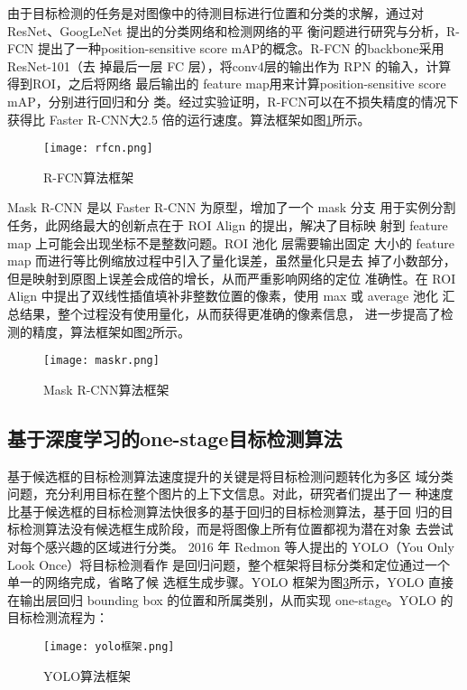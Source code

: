 由于目标检测的任务是对图像中的待测目标进行位置和分类的求解，通过对ResNet、GoogLeNet
提出的分类网络和检测网络的平
衡问题进行研究与分析，R-FCN 提出了一种position-sensitive score mAP的概念。R-FCN 的backbone采用ResNet-101（去
掉最后一层 FC 层），将conv4层的输出作为 RPN 的输入，计算得到ROI，之后将网络
最后输出的 feature map用来计算position-sensitive score mAP，分别进行回归和分
类。经过实验证明，R-FCN可以在不损失精度的情况下获得比 Faster R-CNN大2.5 倍的运行速度。算法框架如图\ref{rfcn}所示。

\begin{figure}[htbp]
    \centering
    \texttt{[image: rfcn.png]}
    \caption{R-FCN算法框架}
    \label{rfcn}
\end{figure}

Mask R-CNN 是以 Faster R-CNN 为原型，增加了一个 mask 分支
用于实例分割任务，此网络最大的创新点在于 ROI Align 的提出，解决了目标映
射到 feature map 上可能会出现坐标不是整数问题。ROI 池化 层需要输出固定
大小的 feature map 而进行等比例缩放过程中引入了量化误差，虽然量化只是去
掉了小数部分，但是映射到原图上误差会成倍的增长，从而严重影响网络的定位
准确性。在 ROI Align 中提出了双线性插值填补非整数位置的像素，使用 max 或
average 池化 汇总结果，整个过程没有使用量化，从而获得更准确的像素信息，
进一步提高了检测的精度，算法框架如图\ref{maskr}所示。

\begin{figure}[htbp]
    \centering
    \texttt{[image: maskr.png]}
    \caption{Mask R-CNN算法框架}
    \label{maskr}
\end{figure}

\subsection{基于深度学习的one-stage目标检测算法}
基于候选框的目标检测算法速度提升的关键是将目标检测问题转化为多区
域分类问题，充分利用目标在整个图片的上下文信息。对此，研究者们提出了一
种速度比基于候选框的目标检测算法快很多的基于回归的目标检测算法，基于回
归的目标检测算法没有候选框生成阶段，而是将图像上所有位置都视为潜在对象
去尝试对每个感兴趣的区域进行分类\cite{jiao2019survey,wu2020recent}。
2016 年 Redmon 等人提出的 YOLO（You Only Look Once）将目标检测看作
是回归问题\cite{redmon2016you}，整个框架将目标分类和定位通过一个单一的网络完成，省略了候
选框生成步骤。YOLO 框架为图\ref{yk}所示，YOLO 直接在输出层回归 bounding box
的位置和所属类别，从而实现 one-stage。YOLO 的目标检测流程为：

\begin{figure}[htbp]
    \centering
    \texttt{[image: yolo框架.png]}
    \caption{YOLO算法框架}
    \label{yk}
\end{figure}

